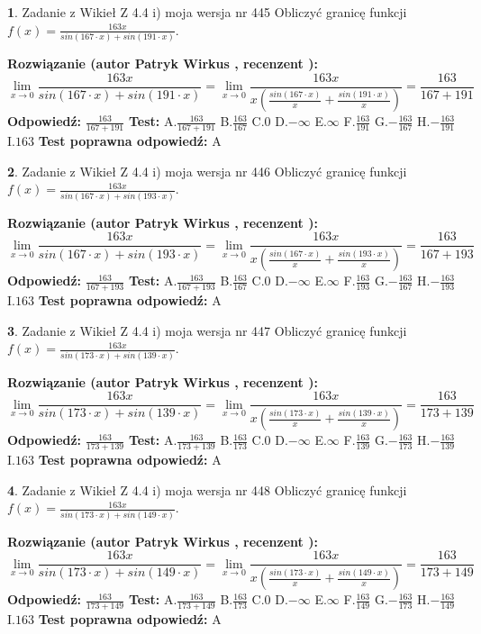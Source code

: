 \documentclass[12pt, a4paper]{article}
\theoremstyle{definition} %
\newtheorem{zad}{}
\newcommand{\zadStart}[1]{\begin{zad}#1\newline}
\newcommand{\zadStop}{\end{zad}}
\newcommand{\rozwStart}[2]{\noindent \textbf{Rozwiązanie (autor #1 , recenzent #2): }\newline}
\newcommand{\rozwStop}{\newline}
\newcommand{\odpStart}{\noindent \textbf{Odpowiedź:}\newline}
\newcommand{\odpStop}{\newline}
\newcommand{\testStart}{\noindent \textbf{Test:}\newline}
\newcommand{\testStop}{\newline}
\newcommand{\kluczStart}{\noindent \textbf{Test poprawna odpowiedź:}\newline}
\newcommand{\kluczStop}{\newline}
\begin{document}
\zadStart{Zadanie z Wikieł Z 4.4 i) moja wersja nr 445}
Obliczyć granicę funkcji $f(x)=\frac{163x}{sin(167\cdot x) +sin(191\cdot x)}$.
\zadStop
\rozwStart{Patryk Wirkus}{}
$$\lim\limits_{x\to 0}\frac{163x}{sin(167\cdot x) +sin(191\cdot x)}=\lim\limits_{x\to 0}\frac{163x}{x(\frac{sin(167\cdot x)}{x}+\frac{sin(191\cdot x)}{x})}=\frac{163}{167+191}$$
\rozwStop
\odpStart
$\frac{163}{167+191}$
\odpStop
\testStart
A.$\frac{163}{167+191}$
B.$\frac{163}{167}$
C.$0$
D.$-\infty$
E.$\infty$
F.$\frac{163}{191}$
G.$-\frac{163}{167}$
H.$-\frac{163}{191}$
I.$163$
\testStop
\kluczStart
A
\kluczStop



\zadStart{Zadanie z Wikieł Z 4.4 i) moja wersja nr 446}
Obliczyć granicę funkcji $f(x)=\frac{163x}{sin(167\cdot x) +sin(193\cdot x)}$.
\zadStop
\rozwStart{Patryk Wirkus}{}
$$\lim\limits_{x\to 0}\frac{163x}{sin(167\cdot x) +sin(193\cdot x)}=\lim\limits_{x\to 0}\frac{163x}{x(\frac{sin(167\cdot x)}{x}+\frac{sin(193\cdot x)}{x})}=\frac{163}{167+193}$$
\rozwStop
\odpStart
$\frac{163}{167+193}$
\odpStop
\testStart
A.$\frac{163}{167+193}$
B.$\frac{163}{167}$
C.$0$
D.$-\infty$
E.$\infty$
F.$\frac{163}{193}$
G.$-\frac{163}{167}$
H.$-\frac{163}{193}$
I.$163$
\testStop
\kluczStart
A
\kluczStop



\zadStart{Zadanie z Wikieł Z 4.4 i) moja wersja nr 447}
Obliczyć granicę funkcji $f(x)=\frac{163x}{sin(173\cdot x) +sin(139\cdot x)}$.
\zadStop
\rozwStart{Patryk Wirkus}{}
$$\lim\limits_{x\to 0}\frac{163x}{sin(173\cdot x) +sin(139\cdot x)}=\lim\limits_{x\to 0}\frac{163x}{x(\frac{sin(173\cdot x)}{x}+\frac{sin(139\cdot x)}{x})}=\frac{163}{173+139}$$
\rozwStop
\odpStart
$\frac{163}{173+139}$
\odpStop
\testStart
A.$\frac{163}{173+139}$
B.$\frac{163}{173}$
C.$0$
D.$-\infty$
E.$\infty$
F.$\frac{163}{139}$
G.$-\frac{163}{173}$
H.$-\frac{163}{139}$
I.$163$
\testStop
\kluczStart
A
\kluczStop



\zadStart{Zadanie z Wikieł Z 4.4 i) moja wersja nr 448}
Obliczyć granicę funkcji $f(x)=\frac{163x}{sin(173\cdot x) +sin(149\cdot x)}$.
\zadStop
\rozwStart{Patryk Wirkus}{}
$$\lim\limits_{x\to 0}\frac{163x}{sin(173\cdot x) +sin(149\cdot x)}=\lim\limits_{x\to 0}\frac{163x}{x(\frac{sin(173\cdot x)}{x}+\frac{sin(149\cdot x)}{x})}=\frac{163}{173+149}$$
\rozwStop
\odpStart
$\frac{163}{173+149}$
\odpStop
\testStart
A.$\frac{163}{173+149}$
B.$\frac{163}{173}$
C.$0$
D.$-\infty$
E.$\infty$
F.$\frac{163}{149}$
G.$-\frac{163}{173}$
H.$-\frac{163}{149}$
I.$163$
\testStop
\kluczStart
A
\kluczStop
\end{document}
